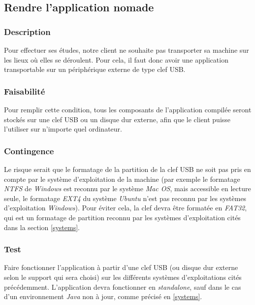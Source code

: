 \subsection{Rendre l'application nomade}\label{nomadite}

\subsubsection{Description}

Pour effectuer ses études, notre client ne souhaite pas transporter sa machine sur les lieux où elles se déroulent. Pour cela, il faut donc avoir une application transportable sur un périphérique externe de type clef USB.

\subsubsection{Faisabilité}

Pour remplir cette condition, tous les composants de l’application compilée seront stockés sur une clef USB ou un disque dur externe, afin que le client puisse l'utiliser sur n’importe quel ordinateur.

\subsubsection{Contingence}

Le risque serait que le formatage de la partition de la clef USB ne soit pas pris en compte par le système d’exploitation de la machine (par exemple le formatage \textit{NTFS} de \textit{Windows} est reconnu par le système \textit{Mac OS}, mais accessible en lecture seule, le formatage \textit{EXT4} du système \textit{Ubuntu} n’est pas reconnu par les systèmes d’exploitation \textit{Windows}). Pour éviter cela, la clef devra être formatée en \textit{FAT32}, qui est un formatage de partition reconnu par les systèmes d’exploitation cités dans la section \ref{systems}.

\subsubsection{Test}

Faire fonctionner l’application à partir d’une clef USB (ou disque dur externe selon le support qui sera choisi) sur les différents systèmes d’exploitations cités précédemment. L'application devra fonctionner en \textit{standalone}, sauf dans le cas d'un environnement \textit{Java} non à jour, comme précisé en \ref{systems}.

